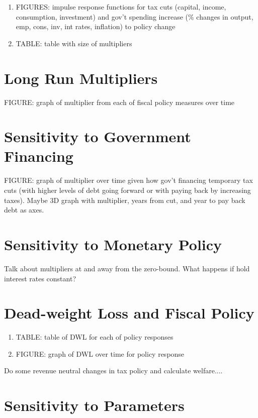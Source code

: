 \documentclass[article,11pt,letterpaper,fleqn]{article}
\theoremstyle{definition}
\numberwithin{equation}{section}
\begin{document}
\begin{enumerate}
\item FIGURES: impulse response functions for tax cuts (capital, income, consumption, investment) and gov't spending increase (\% changes in output, emp, cons, inv, int rates, inflation) to policy change
\item TABLE: table with size of multipliers
\end{enumerate}

\section{Long Run Multipliers}

FIGURE: graph of multiplier from each of fiscal policy measures over time 

\section{Sensitivity to Government Financing}

FIGURE: graph of multiplier over time given how gov't financing temporary tax cuts (with higher levels of debt going forward or with paying back by increasing taxes).  Maybe 3D graph with multiplier, years from cut, and year to pay back debt as axes.

\section{Sensitivity to Monetary Policy}

Talk about multipliers at and away from the zero-bound.  What happens if hold interest rates constant?  

\section{Dead-weight Loss and Fiscal Policy}

\begin{enumerate}
\item TABLE: table of DWL for each of policy responses
\item FIGURE: graph of DWL over time for policy response
\end{enumerate}

Do some revenue neutral changes in tax policy and calculate welfare....

\section{Sensitivity to Parameters}
\end{document}
